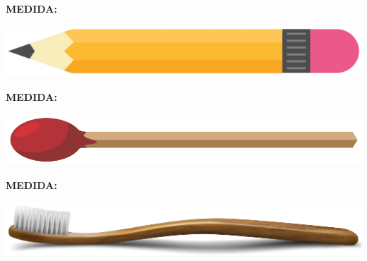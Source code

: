 \begin{escolha}
\item \textbf{MEDIDA:} 

\centering\includegraphics[width=.6\textwidth]{./media/SAEB_1ANO_MAT_FIGURA40.png}

\vspace{1cm}

\item \textbf{MEDIDA:} 

\centering\includegraphics[width=.5\textwidth]{./media/SAEB_1ANO_MAT_FIGURA41.png}

\vspace{1cm}

\item \textbf{MEDIDA:} 

\centering\includegraphics[width=.7\textwidth]{./media/SAEB_1ANO_MAT_FIGURA42.png}
\end{escolha}



